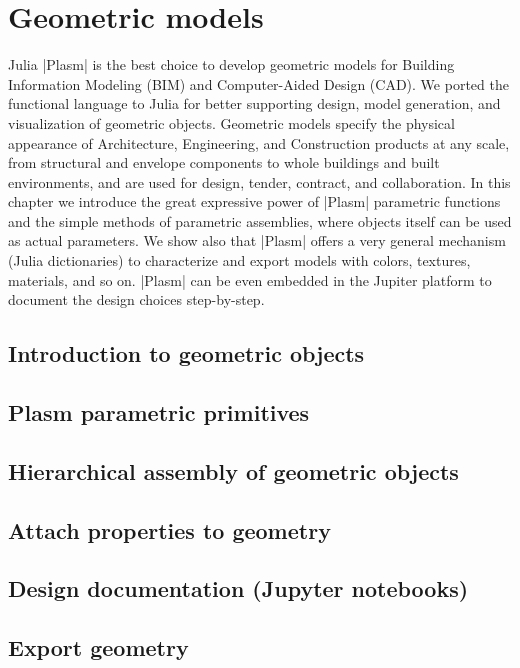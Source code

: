 
\chapter{Geometric models}
\label{chapt:4}

Julia |Plasm| is the best choice to develop geometric models for Building Information Modeling (BIM) and Computer-Aided Design (CAD). We ported the  functional language to Julia for better supporting design, model generation, and visualization of geometric objects. Geometric models specify the physical appearance of Architecture, Engineering, and Construction products at any scale, from structural and envelope components to whole buildings and built environments, and are used for design, tender, contract, and collaboration. 
In this chapter we introduce the great expressive power of |Plasm| parametric functions and the simple methods of parametric assemblies, where objects itself can be used as actual parameters. We show also that |Plasm| offers a very general mechanism (Julia dictionaries) to characterize and export models with colors, textures, materials, and so on. |Plasm| can be even embedded in the Jupiter platform to document the design choices step-by-step.

\section{Introduction to geometric objects}\label{sect:4-1}


\section{Plasm parametric primitives}\label{sect:4-2}


\section{Hierarchical assembly of geometric objects}\label{sect:4-3}


\section{Attach properties to geometry}\label{sect:4-4}


\section{Design documentation (Jupyter notebooks)}\label{sect:4-5}


\section{Export geometry}\label{sect:4-6}

